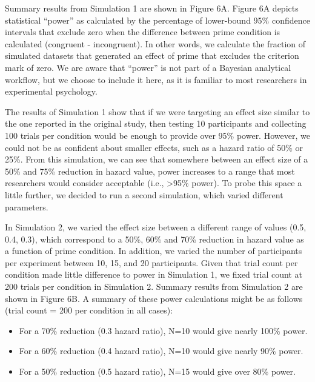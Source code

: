 \documentclass[
  man, donotrepeattitle,floatsintext]{apa6}
\providecommand{\tightlist}{%
  \setlength{\itemsep}{0pt}\setlength{\parskip}{0pt}}
\begin{document}
Summary results from Simulation 1 are shown in Figure 6A.
Figure 6A depicts statistical ``power'' as calculated by the percentage of lower-bound 95\% confidence intervals that exclude zero when the difference between prime condition is calculated (congruent - incongruent).
In other words, we calculate the fraction of simulated datasets that generated an effect of prime that excludes the criterion mark of zero.
We are aware that ``power'' is not part of a Bayesian analytical workflow, but we choose to include it here, as it is familiar to most researchers in experimental psychology.

The results of Simulation 1 show that if we were targeting an effect size similar to the one reported in the original study, then testing 10 participants and collecting 100 trials per condition would be enough to provide over 95\% power.
However, we could not be as confident about smaller effects, such as a hazard ratio of 50\% or 25\%.
From this simulation, we can see that somewhere between an effect size of a 50\% and 75\% reduction in hazard value, power increases to a range that most researchers would consider acceptable (i.e., \textgreater95\% power).
To probe this space a little further, we decided to run a second simulation, which varied different parameters.

In Simulation 2, we varied the effect size between a different range of values (0.5, 0.4, 0.3), which correspond to a 50\%, 60\% and 70\% reduction in hazard value as a function of prime condition.
In addition, we varied the number of participants per experiment between 10, 15, and 20 participants.
Given that trial count per condition made little difference to power in Simulation 1, we fixed trial count at 200 trials per condition in Simulation 2.
Summary results from Simulation 2 are shown in Figure 6B.
A summary of these power calculations might be as follows (trial count = 200 per condition in all cases):

\begin{itemize}
\tightlist
\item
  For a 70\% reduction (0.3 hazard ratio), N=10 would give nearly 100\% power.
\item
  For a 60\% reduction (0.4 hazard ratio), N=10 would give nearly 90\% power.
\item
  For a 50\% reduction (0.5 hazard ratio), N=15 would give over 80\% power.
\end{itemize}
\end{document}
